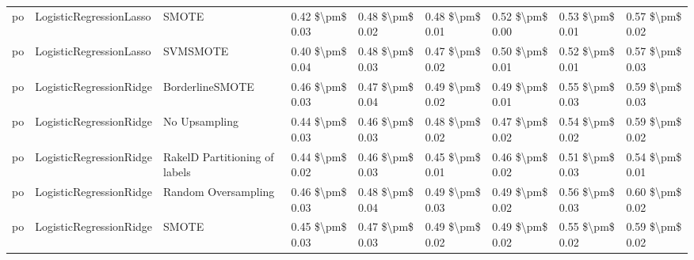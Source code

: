\begin{tabular}{lllllllll}
      po &         LogisticRegressionLasso &                         SMOTE & 0.42 \$\textbackslash pm\$ 0.03 &           0.48 \$\textbackslash pm\$ 0.02 &       0.48 \$\textbackslash pm\$ 0.01 &        0.52 \$\textbackslash pm\$ 0.00 &                         0.53 \$\textbackslash pm\$ 0.01 &     0.57 \$\textbackslash pm\$ 0.02 \\
      po &         LogisticRegressionLasso &                      SVMSMOTE & 0.40 \$\textbackslash pm\$ 0.04 &           0.48 \$\textbackslash pm\$ 0.03 &       0.47 \$\textbackslash pm\$ 0.02 &        0.50 \$\textbackslash pm\$ 0.01 &                         0.52 \$\textbackslash pm\$ 0.01 &     0.57 \$\textbackslash pm\$ 0.03 \\
      po &         LogisticRegressionRidge &               BorderlineSMOTE & 0.46 \$\textbackslash pm\$ 0.03 &           0.47 \$\textbackslash pm\$ 0.04 &       0.49 \$\textbackslash pm\$ 0.02 &        0.49 \$\textbackslash pm\$ 0.01 &                         0.55 \$\textbackslash pm\$ 0.03 &     0.59 \$\textbackslash pm\$ 0.03 \\
      po &         LogisticRegressionRidge &                 No Upsampling & 0.44 \$\textbackslash pm\$ 0.03 &           0.46 \$\textbackslash pm\$ 0.03 &       0.48 \$\textbackslash pm\$ 0.02 &        0.47 \$\textbackslash pm\$ 0.02 &                         0.54 \$\textbackslash pm\$ 0.02 &     0.59 \$\textbackslash pm\$ 0.02 \\
      po &         LogisticRegressionRidge & RakelD Partitioning of labels & 0.44 \$\textbackslash pm\$ 0.02 &           0.46 \$\textbackslash pm\$ 0.03 &       0.45 \$\textbackslash pm\$ 0.01 &        0.46 \$\textbackslash pm\$ 0.02 &                         0.51 \$\textbackslash pm\$ 0.03 &     0.54 \$\textbackslash pm\$ 0.01 \\
      po &         LogisticRegressionRidge &           Random Oversampling & 0.46 \$\textbackslash pm\$ 0.03 &           0.48 \$\textbackslash pm\$ 0.04 &       0.49 \$\textbackslash pm\$ 0.03 &        0.49 \$\textbackslash pm\$ 0.02 &                         0.56 \$\textbackslash pm\$ 0.03 &     0.60 \$\textbackslash pm\$ 0.02 \\
      po &         LogisticRegressionRidge &                         SMOTE & 0.45 \$\textbackslash pm\$ 0.03 &           0.47 \$\textbackslash pm\$ 0.03 &       0.49 \$\textbackslash pm\$ 0.02 &        0.49 \$\textbackslash pm\$ 0.02 &                         0.55 \$\textbackslash pm\$ 0.02 &     0.59 \$\textbackslash pm\$ 0.02 \\

\end{tabular}
